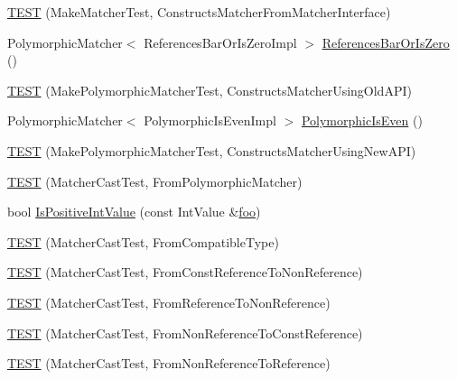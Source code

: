 \begin{DoxyCompactItemize}
\item 
\mbox{\hyperlink{namespacetesting_1_1gmock__matchers__test_ae433e93168010d7316b40ef4a5088d09}{T\+E\+ST}} (Make\+Matcher\+Test, Constructs\+Matcher\+From\+Matcher\+Interface)
\item 
Polymorphic\+Matcher$<$ References\+Bar\+Or\+Is\+Zero\+Impl $>$ \mbox{\hyperlink{namespacetesting_1_1gmock__matchers__test_ac07376a5dff45a905b7eb96e621ce3aa}{References\+Bar\+Or\+Is\+Zero}} ()
\item 
\mbox{\hyperlink{namespacetesting_1_1gmock__matchers__test_aad0604e47fea147ae133d134b4606a26}{T\+E\+ST}} (Make\+Polymorphic\+Matcher\+Test, Constructs\+Matcher\+Using\+Old\+A\+PI)
\item 
Polymorphic\+Matcher$<$ Polymorphic\+Is\+Even\+Impl $>$ \mbox{\hyperlink{namespacetesting_1_1gmock__matchers__test_a8a0035a0de2d219d89ff7070762ece72}{Polymorphic\+Is\+Even}} ()
\item 
\mbox{\hyperlink{namespacetesting_1_1gmock__matchers__test_a619d872aa86419c5093327f64c466df3}{T\+E\+ST}} (Make\+Polymorphic\+Matcher\+Test, Constructs\+Matcher\+Using\+New\+A\+PI)
\item 
\mbox{\hyperlink{namespacetesting_1_1gmock__matchers__test_afffaa6f2c436edb7c46e7a16ed2de825}{T\+E\+ST}} (Matcher\+Cast\+Test, From\+Polymorphic\+Matcher)
\item 
bool \mbox{\hyperlink{namespacetesting_1_1gmock__matchers__test_a68565741c989968637db5a9e10e55020}{Is\+Positive\+Int\+Value}} (const Int\+Value \&\mbox{\hyperlink{namespacetesting_1_1gmock__matchers__test_a3536e68112ffbb1f76887cd15bb45c15}{foo}})
\item 
\mbox{\hyperlink{namespacetesting_1_1gmock__matchers__test_aa7a28536a6c59d56bbbbdb4fa5ba9e4d}{T\+E\+ST}} (Matcher\+Cast\+Test, From\+Compatible\+Type)
\item 
\mbox{\hyperlink{namespacetesting_1_1gmock__matchers__test_a9d25aac0defd9296bf207cacd342aff0}{T\+E\+ST}} (Matcher\+Cast\+Test, From\+Const\+Reference\+To\+Non\+Reference)
\item 
\mbox{\hyperlink{namespacetesting_1_1gmock__matchers__test_a4bb3955a1e0b603c0156c98a2dc49eea}{T\+E\+ST}} (Matcher\+Cast\+Test, From\+Reference\+To\+Non\+Reference)
\item 
\mbox{\hyperlink{namespacetesting_1_1gmock__matchers__test_a6fd48b8275f96d9d4ee840f0ec590fb1}{T\+E\+ST}} (Matcher\+Cast\+Test, From\+Non\+Reference\+To\+Const\+Reference)
\item 
\mbox{\hyperlink{namespacetesting_1_1gmock__matchers__test_ab8d3174b8f1ab799906938ed9984643b}{T\+E\+ST}} (Matcher\+Cast\+Test, From\+Non\+Reference\+To\+Reference)

\end{DoxyCompactItemize}
